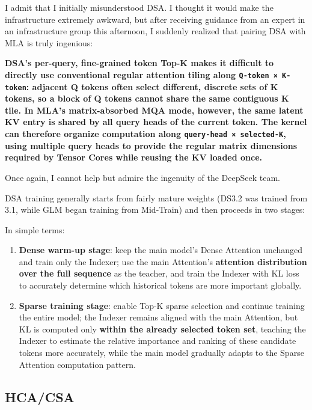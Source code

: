 \documentclass[
  a4paper,
  10pt]{article}
\begin{document}
I admit that I initially misunderstood DSA. I thought it would make the
infrastructure extremely awkward, but after receiving guidance from an
expert in an infrastructure group this afternoon, I suddenly realized
that pairing DSA with MLA is truly ingenious:

\textbf{DSA's per-query, fine-grained token Top-K makes it difficult to
directly use conventional regular attention tiling along
\texttt{Q-token\ ×\ K-token}: adjacent Q tokens often select different,
discrete sets of K tokens, so a block of Q tokens cannot share the same
contiguous K tile. In MLA's matrix-absorbed MQA mode, however, the same
latent KV entry is shared by all query heads of the current token. The
kernel can therefore organize computation along
\texttt{query-head\ ×\ selected-K}, using multiple query heads to
provide the regular matrix dimensions required by Tensor Cores while
reusing the KV loaded once.}

Once again, I cannot help but admire the ingenuity of the DeepSeek team.

DSA training generally starts from fairly mature weights (DS3.2 was
trained from 3.1, while GLM began training from Mid-Train) and then
proceeds in two stages:

In simple terms:

\begin{enumerate}
\def\labelenumi{\arabic{enumi}.}
\item
  \textbf{Dense warm-up stage}: keep the main model's Dense Attention
  unchanged and train only the Indexer; use the main Attention's
  \textbf{attention distribution over the full sequence} as the teacher,
  and train the Indexer with KL loss to accurately determine which
  historical tokens are more important globally.
\item
  \textbf{Sparse training stage}: enable Top-K sparse selection and
  continue training the entire model; the Indexer remains aligned with
  the main Attention, but KL is computed only \textbf{within the already
  selected token set}, teaching the Indexer to estimate the relative
  importance and ranking of these candidate tokens more accurately,
  while the main model gradually adapts to the Sparse Attention
  computation pattern.
\end{enumerate}

\subsection{HCA/CSA}\label{hcacsa}
\end{document}
